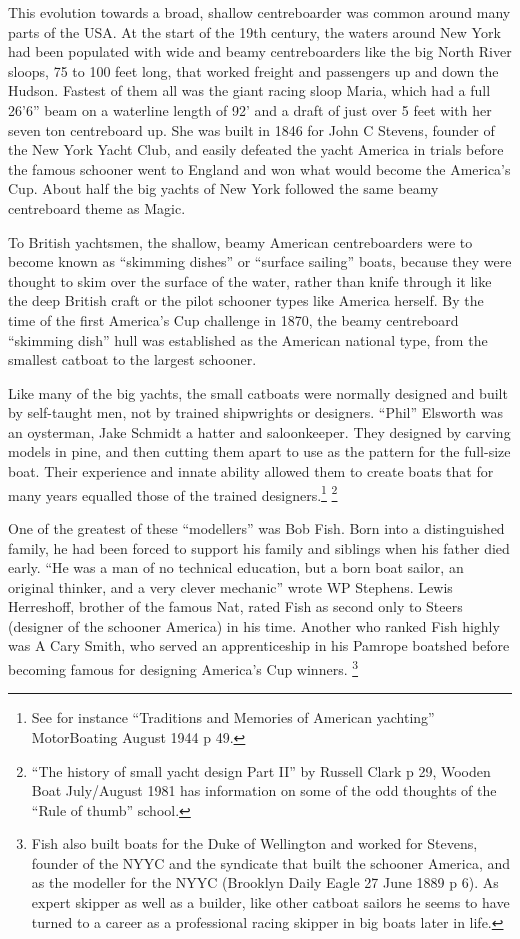 \documentclass[
  letterpaper,
]{scrbook}
\begin{document}
This evolution towards a broad, shallow centreboarder was common around
many parts of the USA. At the start of the 19th century, the waters
around New York had been populated with wide and beamy centreboarders
like the big North River sloops, 75 to 100 feet long, that worked
freight and passengers up and down the Hudson. Fastest of them all was
the giant racing sloop Maria, which had a full 26'6'' beam on a
waterline length of 92' and a draft of just over 5 feet with her seven
ton centreboard up. She was built in 1846 for John C Stevens, founder of
the New York Yacht Club, and easily defeated the yacht America in trials
before the famous schooner went to England and won what would become the
America's Cup. About half the big yachts of New York followed the same
beamy centreboard theme as Magic.

To British yachtsmen, the shallow, beamy American centreboarders were to
become known as ``skimming dishes'' or ``surface sailing'' boats,
because they were thought to skim over the surface of the water, rather
than knife through it like the deep British craft or the pilot schooner
types like America herself. By the time of the first America's Cup
challenge in 1870, the beamy centreboard ``skimming dish'' hull was
established as the American national type, from the smallest catboat to
the largest schooner.

Like many of the big yachts, the small catboats were normally designed
and built by self-taught men, not by trained shipwrights or designers.
``Phil'' Elsworth was an oysterman, Jake Schmidt a hatter and
saloonkeeper. They designed by carving models in pine, and then cutting
them apart to use as the pattern for the full-size boat. Their
experience and innate ability allowed them to create boats that for many
years equalled those of the trained designers.\footnote{See for instance
  ``Traditions and Memories of American yachting'' MotorBoating August
  1944 p 49.} \footnote{``The history of small yacht design Part II'' by
  Russell Clark p 29, Wooden Boat July/August 1981 has information on
  some of the odd thoughts of the ``Rule of thumb'' school.}

One of the greatest of these ``modellers'' was Bob Fish. Born into a
distinguished family, he had been forced to support his family and
siblings when his father died early. ``He was a man of no technical
education, but a born boat sailor, an original thinker, and a very
clever mechanic'' wrote WP Stephens. Lewis Herreshoff, brother of the
famous Nat, rated Fish as second only to Steers (designer of the
schooner America) in his time. Another who ranked Fish highly was A Cary
Smith, who served an apprenticeship in his Pamrope boatshed before
becoming famous for designing America's Cup winners. \footnote{Fish also
  built boats for the Duke of Wellington and worked for Stevens, founder
  of the NYYC and the syndicate that built the schooner America, and as
  the modeller for the NYYC (Brooklyn Daily Eagle 27 June 1889 p 6). As
  expert skipper as well as a builder, like other catboat sailors he
  seems to have turned to a career as a professional racing skipper in
  big boats later in life.}
\end{document}
